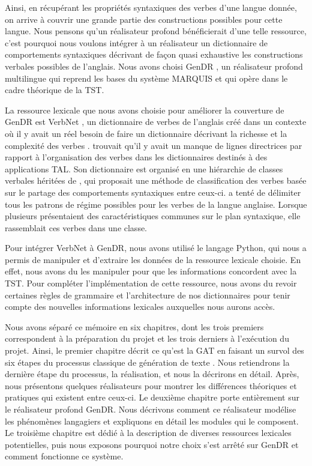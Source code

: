 Ainsi, en récupérant les propriétés syntaxiques des verbes d'une langue donnée, on arrive à couvrir une grande partie des constructions possibles pour cette langue. Nous pensons qu'un réalisateur profond bénéficierait d'une telle ressource, c'est pourquoi nous voulons intégrer à un réalisateur un dictionnaire de comportements syntaxiques décrivant de façon quasi exhaustive les constructions verbales possibles de l'anglais. Nous avons choisi GenDR \citep{lareau18,lambrey15,LambreyGECOv1User2016,LambreyImplementationcollocationspour2017,dubinskaite17}, un réalisateur profond multilingue qui reprend les bases du système MARQUIS et qui opère dans le cadre théorique de la \ac{TST}.

La ressource lexicale que nous avons choisie pour améliorer la couverture de GenDR est VerbNet \citep{SchulerVerbnetBroadcoverageComprehensive2005}, un dictionnaire de verbes de l'anglais créé dans un contexte où il y avait un réel besoin de faire un dictionnaire décrivant la richesse et la complexité des verbes \citep{KipperClassBasedConstructionVerb2000}. \cite{SchulerVerbnetBroadcoverageComprehensive2005} trouvait qu'il y avait un manque de lignes directrices par rapport à l'organisation des verbes dans les dictionnaires destinés à des applications \ac{TAL}. Son dictionnaire est organisé en une hiérarchie de classes verbales héritées de \cite{verb-classes.levin.1993}, qui proposait une méthode de classification des verbes basée sur le partage des comportements syntaxiques entre ceux-ci. \citeauthor{verb-classes.levin.1993} a tenté de délimiter tous les patrons de régime possibles pour les verbes de la langue anglaise. Lorsque plusieurs présentaient des caractéristiques communes sur le plan syntaxique, elle rassemblait ces verbes dans une classe.

Pour intégrer VerbNet à GenDR, nous avons utilisé le langage Python, qui nous a permis de manipuler et d'extraire les données de la ressource lexicale choisie. En effet, nous avons du les manipuler pour que les informations concordent avec la \ac{TST}. Pour compléter l'implémentation de cette ressource, nous avons du revoir certaines règles de grammaire et l'architecture de nos dictionnaires pour tenir compte des nouvelles informations lexicales auxquelles nous aurons accès.

Nous avons séparé ce mémoire en six chapitres, dont les trois premiers correspondent à la préparation du projet et les trois derniers à l'exécution du projet. Ainsi, le premier chapitre décrit ce qu'est la \ac{GAT} en faisant un survol des six étapes du processus classique de génération de texte \citep{ReiterBuildingNaturalLanguage2000}. Nous retiendrons la dernière étape du processus, la réalisation, et nous la décrirons en détail. Après, nous présentons quelques réalisateurs pour montrer les différences théoriques et pratiques qui existent entre ceux-ci. Le deuxième chapitre porte entièrement sur le réalisateur profond GenDR. Nous décrivons comment ce réalisateur modélise les phénomènes langagiers et expliquons en détail les modules qui le composent. Le troisième chapitre est dédié à la description de diverses ressources lexicales potentielles, puis nous exposons pourquoi notre choix s'est arrêté sur GenDR et comment fonctionne ce système.


